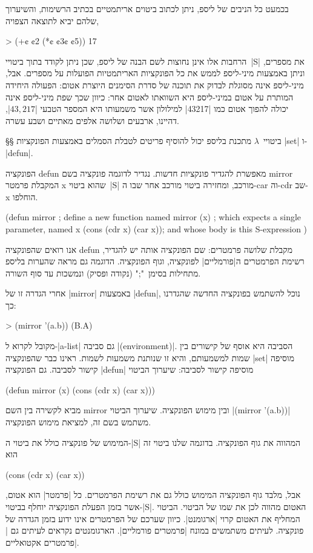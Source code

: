 בכמעט כל הניבים של ליספ, ניתן לכתוב ביטוים אריתמטיים בכתיב הרשימות, והשיערוך
שלהם יביא לתוצאה הצפויה,

\begin{LISP}
> (+¢ ¢2 (*¢ ¢3¢ ¢5))
17
\end{LISP}

הרחבות אלו אינן נחוצות לשם הבנה של ליספ, שכן ניתן לקודד בתוך ביטויי~\E|S| את
מספרים, וניתן באמצעות מיני-ליספ לממש את כל הפונקציות האריתמטיות הפועלות על
מספרים. אבל, מיני-ליספ אינה מסוגלת לבדוק את תוכנה של סדרת הסימנים היוצרת אטום:
הפעולה היחידה המותרת על אטום במיני-ליספ היא השוואתו לאטום אחר: כיוון שכך שפת
מיני-ליספ אינה יכולה להפוך אטום כמו \T|43217| למילולון אשר משמעותו היא המספר
הטבעי \E|$43,217$|, דהיינו, ארבעים ושלושה אלפים מאתיים ושבע עשרה.

§§ ביטויי~$λ$
מתכנת בליספ יכול להוסיף פריטים לטבלת הסמלים באמצעות הפונקציות \E|set|
ו-\E|defun|.

הפונקציה defun מאפשרת להגדיר פונקציות חדשות. נגדיר לדוגמה פונקציה בשם mirror
המקבלת פרמטר x שהוא ביטוי~\E|S| מורכב, ומחזירה ביטוי מורכב אחר שבו ה-car וה-cdr
שב-x הוחלפו.
\begin{LISP}
(defun mirror ; define a new function named mirror
  (x) ; which expects a single parameter, named x
  (cons (cdr x) (car x)); and whose body is this S-expression
)
\end{LISP}
אנו רואים שהפונקציה defun מקבלת שלושה פרמטרים: שם הפונקציה אותה יש להגדיר,
רשימת הפרמטרים ה\ע|פורמליים| לפונקציה, וגוף הפונקציה. הדוגמה גם מראה שהערות
בליספ מתחילות בסימן~";" (נקודה ופסיק) ונמשכות עד סוף השורה.

אחרי הגדרה זו של \E|mirror| באמצעות \E|defun|, נוכל להשתמש בפונקציה החדשה
שהגדרנו כך:
\begin{LISP}
> (mirror '(a.b))
(B.A)
\end{LISP}

מקובל לקרוא ל-\E|a-list| גם סביבה \E|(environment)|. הסביבה היא אוסף של קישורים
בין שמות למשמעותם, והיא זו שנותנת משמעות לשמות. ראינו כבר שהפונקציה \E|set|
מוסיפה קישור לסביבה. גם הפונקציה \E|defun| מוסיפה קישור לסביבה: שיערוך הביטוי
\begin{LISP}
(defun mirror (x) (cons (cdr x) (car x)))
\end{LISP}
מביא לקשירה בין השם mirror ובין מימוש הפונקציה. שיערוך הביטוי \T|(mirror
'(a.b))| משתמש בשם זה, למציאת מימוש הפונקציה.

המימוש של פונקציה כולל את ביטוי ה-\E|S| המהווה את גוף הפונקציה. בדוגמה שלנו ביטוי
זה הוא
\begin{LISP}
(cons (cdr x) (car x))
\end{LISP}
אבל, מלבד גוף הפונקציה המימוש כולל גם את רשימת הפרמטרים. כל \ע|פרמטר|
הוא אטום, אשר בזמן הפעלת הפונקציה יוחלף בביטוי-\E|S|. האטום מהווה לכן את שמו של
הביטוי. הביטוי המחליף את האטום קרוי \ע|ארגומנט|. כיוון שערכם של הפרמטרים
אינו ידוע בזמן הגדרה של פונקציה. לעיתים משתמשים במונח \ע|פרמטרים פורמליים|.
הארגומנטים נקראים לעיתים גם \ע|פרמטרים אקטואליים|.

